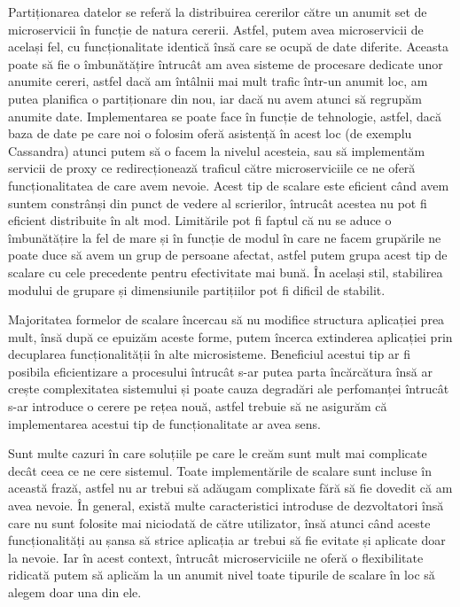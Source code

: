 Partiționarea datelor se referă la distribuirea cererilor către un anumit set de microservicii
în funcție de natura cererii. Astfel, putem avea microservicii de același fel, cu funcționalitate
identică însă care se ocupă de date diferite. Aceasta poate să fie o îmbunătățire întrucât
am avea sisteme de procesare dedicate unor anumite cereri, astfel dacă am întâlnii mai mult
trafic într-un anumit loc, am putea planifica o partiționare din nou, iar dacă nu avem
atunci să regrupăm anumite date. Implementarea se poate face în funcție de tehnologie, astfel,
dacă baza de date pe care noi o folosim oferă asistență în acest loc (de exemplu Cassandra)
atunci putem să o facem la nivelul acesteia, sau să implementăm servicii de proxy ce redirecționează
traficul către microserviciile ce ne oferă funcționalitatea de care avem nevoie. Acest tip
de scalare este eficient când avem suntem constrânși din punct de vedere al scrierilor,
întrucât acestea nu pot fi eficient distribuite în alt mod. Limitările pot fi
faptul că nu se aduce o îmbunătățire la fel de mare și în funcție de modul în care ne facem
grupările ne poate duce să avem un grup de persoane afectat, astfel putem grupa
acest tip de scalare cu cele precedente pentru efectivitate mai bună. În același stil,
stabilirea modului de grupare și dimensiunile partițiilor pot fi dificil de stabilit.

Majoritatea formelor de scalare încercau să nu modifice structura aplicației prea mult,
însă după ce epuizăm aceste forme, putem încerca extinderea aplicației prin decuplarea
funcționalității în alte microsisteme. Beneficiul acestui tip ar fi posibila eficientizare
a procesului întrucât s-ar putea parta încărcătura însă ar crește complexitatea sistemului
și poate cauza degradări ale perfomanței întrucât s-ar introduce o cerere pe rețea nouă,
astfel trebuie să ne asigurăm că implementarea acestui tip de funcționalitate ar avea
sens.

Sunt multe cazuri în care soluțiile pe care le creăm sunt mult mai complicate decât ceea ce
ne cere sistemul. Toate implementările de scalare sunt incluse în această frază, astfel
nu ar trebui să adăugam complixate fără să fie dovedit că am avea nevoie. În general,
există multe caracteristici introduse de dezvoltatori însă care nu sunt folosite mai niciodată
de către utilizator, însă atunci când aceste funcționalități au șansa să strice aplicația
ar trebui să fie evitate și aplicate doar la nevoie. Iar în acest context, întrucât microserviciile
ne oferă o flexibilitate ridicată putem să aplicăm la un anumit nivel toate tipurile de scalare
în loc să alegem doar una din ele.

